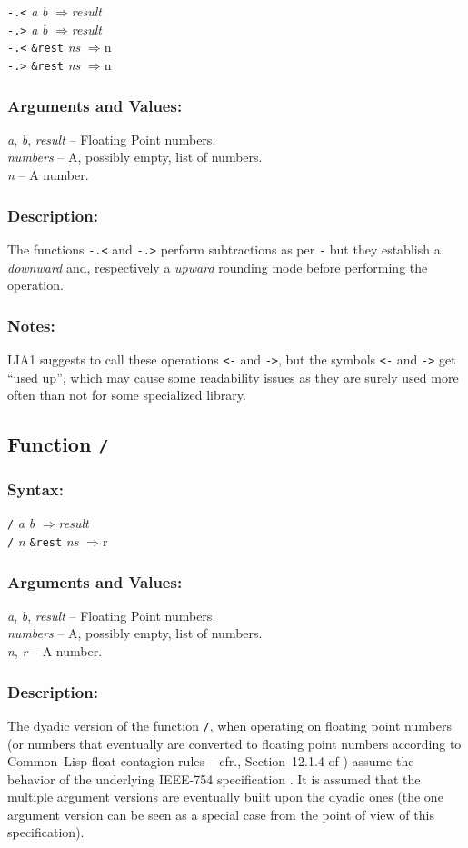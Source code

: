\documentclass[10pt,fleqn]{article}
\newcommand{\CL}{\textsf{Common~Lisp}}
\newcommand{\code}[1]{\texttt{#1}}
\newcommand{\varname}[1]{\textit{#1}}
\newcommand{\RArrow}{$\Rightarrow$}
\newcommand{\IEEEFPStd}{IEEE-754}
\newcommand{\DDictionaryItem}[1]{\vspace*{6pt}\noindent\hrulefill\vspace*{-9pt}\subsection*{#1}}
\newcommand{\DSyntax}{\subsubsection*{Syntax:}}
\newcommand{\DArgsNValues}{\subsubsection*{Arguments and Values:}}
\newcommand{\DDescription}{\subsubsection*{Description:}}
\newcommand{\DNotes}{\subsubsection*{Notes:}}
\begin{document}
\code{-.<} \varname{a} \varname{b} \RArrow \varname{result}\\
\code{-.>} \varname{a} \varname{b} \RArrow \varname{result}\\
\code{-.<} \code{\&rest} \varname{ns} \RArrow \varname \code{n}\\
\code{-.>} \code{\&rest} \varname{ns} \RArrow \varname \code{n}\\

\DArgsNValues{}

\varname{a}, \varname{b}, \varname{result} -- Floating Point numbers.\\
\varname{numbers} -- A, possibly empty, list of numbers.\\
\varname{n} -- A number.

\DDescription{}

The functions  \code{-.<} and \code{-.>} perform subtractions as per \code{-}
but they establish a \emph{downward} and, respectively a
\emph{upward} rounding mode before performing the operation.

\DNotes{}

LIA1 suggests to call these operations \code{<-} and \code{->}, but the symbols \code{<-}
and \code{->} get ``used up'', which may cause some readability issues
as they are surely used more often than not for some specialized
library.


\DDictionaryItem{Function \code{/}}
\index{*!\code{/}}

\DSyntax{}

\code{/} \varname{a} \varname{b} \RArrow \varname{result}\\
\code{/} \varname{n} \code{\&rest} \varname{ns} \RArrow \varname \code{r}\\

\DArgsNValues{}

\varname{a}, \varname{b}, \varname{result} -- Floating Point numbers.\\
\varname{numbers} -- A, possibly empty, list of numbers.\\
\varname{n}, \varname{r} -- A number.



\DDescription{}

The dyadic version of the function \code{/}, when operating on
floating point numbers (or numbers that eventually are converted to
floating point numbers according to \CL{} float contagion rules -- cfr.,
Section~12.1.4 of \cite{1996:ANSIHyperSpec}) assume the behavior of the
underlying \IEEEFPStd{} specification \cite{2008:IEEE-754}.  It is assumed that
the multiple argument versions are eventually built upon the dyadic
ones (the one argument version can be seen as a special case from
the point of view of this specification).
\end{document}
